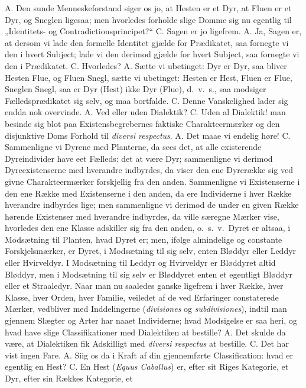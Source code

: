 \documentclass[12pt,a4paper]{book}
\begin{document}
A. Den sunde Menneskeforstand siger os jo, at Hesten er et Dyr, at
Fluen er et Dyr, og Sneglen ligesaa; men hvorledes forholde slige Domme
sig nu egentlig til „Identitets- og Contradictionsprincipet?“ C. Sagen
er jo ligefrem. A. Ja, Sagen er, at dersom vi lade den formelle
Identitet gjælde for Prædikatet, saa fornegte vi den i hvert Subject;
lade vi den derimod gjælde for hvert Subject, saa fornegte vi den i
Prædikatet. C. Hvorledes? A. Sætte vi ubetinget: Dyr er Dyr, saa
bliver Hesten Flue, og Fluen Snegl, sætte vi ubetinget: Hesten er Hest,
Fluen er Flue, Sneglen Snegl, saa er Dyr (Hest) ikke Dyr (Flue),
d.\ v.\ s., saa modsiger Fælledsprædikatet sig selv, og maa bortfalde.
C. Denne Vanskelighed lader sig endda nok overvinde. A. Ved eller
uden Dialektik? C. Uden al Dialektik! man besinde sig blot paa
Existensbegrebernes faktiske Charakteermærker og den disjunktive Doms
Forhold til \textit{diversi respectus}. A. Det maae vi endelig høre!
C. Sammenligne vi Dyrene med Planterne, da sees det, at alle
existerende Dyreindivider have eet Fælleds: det at være Dyr;
sammenligne vi derimod Dyreexistenserne med hverandre indbyrdes, da
viser den ene Dyrerække sig ved givne Charakteermærker forskjellig fra
den anden. Sammenligne vi Existenserne i den ene Række med Existenserne
i den anden, da ere Individerne i hver Række hverandre indbyrdes lige;
men
sammenligne vi derimod de under en given Række hørende Existenser med
hverandre indbyrdes, da ville særegne Mærker vise, hvorledes den ene
Klasse adskiller sig fra den anden, o.\ s.\ v.\ Dyret er altsaa, i
Modsætning til Planten, hvad Dyret er; men, ifølge almindelige og
constante Forskjelsmærker, er Dyret, i Modsætning til sig selv, enten
Bløddyr eller Leddyr eller Hvirveldyr. I Modsætning til Leddyr og
Hvirveldyr er Bløddyret altid Bløddyr, men i Modsætning til sig selv er
Bløddyret enten et egentligt Bløddyr eller et Straaledyr. Naar man nu
saaledes ganske ligefrem i hver Række, hver Klasse, hver Orden, hver
Familie, veiledet af de ved Erfaringer constaterede Mærker, vedbliver
med Inddelingerne (\textit{divisiones} og \textit{subdivisiones}),
indtil man gjennem Slægter og Arter har naaet Individerne; hvad
Modsigelse er saa heri, og hvad have slige Classifikationer med
Dialektiken at bestille? A. Det skulde da være, at Dialektiken fik
Adskilligt med \textit{diversi respectus} at bestille. C. Det har vist
ingen Fare. A. Siig os da i Kraft af din gjennemførte Classification:
hvad er egentlig en Hest? C. En Hest (\textit{Equus Caballus}) er,
efter sit Riges Kategorie, et Dyr, efter sin Rækkes Kategorie, et
\end{document}
